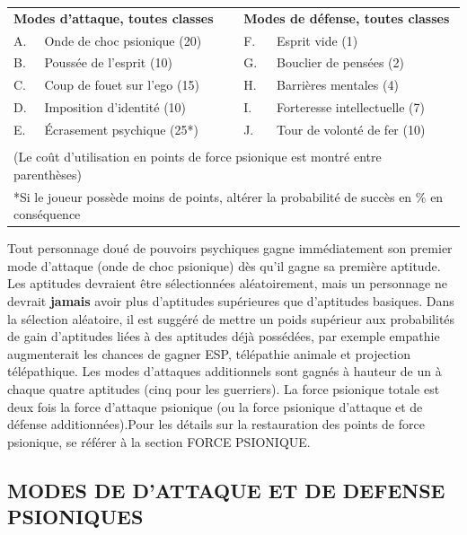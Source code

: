 \documentclass[11pt]{article}
\begin{document}
{{\parindent0.5cm
\begin{tabular}{llcll}
\multicolumn{2}{l}{\textbf{Modes d'attaque, toutes classes}} && \multicolumn{2}{l}{\textbf{Modes de défense, toutes classes}} \\
A. & Onde de choc psionique (20)  && F. & Esprit vide (1) \\
B. & Poussée de l'esprit (10) 	  && G. & Bouclier de pensées (2) \\
C. & Coup de fouet sur l'ego (15) && H. & Barrières mentales (4) \\
D. & Imposition d'identité (10)   && I. & Forteresse intellectuelle (7) \\
E. & Écrasement psychique (25*)   && J. & Tour de volonté de fer (10) \\
&&&& \\
\multicolumn{5}{p{15cm}}{(Le coût d'utilisation en points de force psionique est montré entre parenthèses)} \\
\multicolumn{5}{p{15cm}}{*Si le joueur possède moins de points, altérer la probabilité de succès en \% en conséquence} \\
\end{tabular}}

\bigskip

Tout personnage doué de pouvoirs psychiques gagne immédiatement son premier mode d'attaque (onde de choc psionique) dès qu'il gagne sa première aptitude. Les aptitudes devraient être sélectionnées aléatoirement, mais un personnage ne devrait \textbf{jamais} avoir plus d'aptitudes supérieures que d'aptitudes basiques. Dans la sélection aléatoire, il est suggéré de mettre un poids supérieur aux probabilités de gain d'aptitudes liées à des aptitudes déjà possédées, par exemple empathie augmenterait les chances de gagner ESP, télépathie animale et projection télépathique. Les modes d'attaques additionnels sont gagnés à hauteur de un à chaque quatre aptitudes (cinq pour les guerriers). La force psionique totale est deux fois la force d'attaque psionique (ou la force psionique d'attaque et de défense additionnées).Pour les détails sur la restauration des points de force psionique, se référer à la section FORCE PSIONIQUE. %

\subsection*{\normalsize MODES DE D'ATTAQUE ET DE DEFENSE PSIONIQUES}

}
\end{document}

